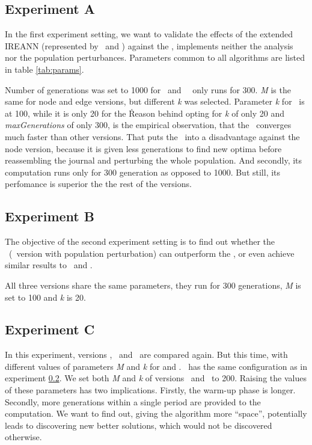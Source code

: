 \documentclass[twoside]{ctuthesis}
\theoremstyle{plain}
\theoremstyle{definition}
\theoremstyle{note}
\begin{document}
\subsection{Experiment A}
\label{sec:expadesc}
In the first experiment setting, we want to validate the effects of the extended IREANN (represented by \nnsrnode\ and \nnsredge) against the \nnsrvanilla, implements neither the analysis nor the population perturbances. Parameters common to all algorithms are listed in table \ref{tab:params}.

Number of generations was set to 1000 for \nnsrvanilla\ and \nnsrnode\, \nnsredge\ only runs for 300. \emph{M} is the same for node and edge versions, but different \emph{k} was selected. Parameter \emph{k} for \nnsrnode\ is at 100, while it is only 20 for the \nnsredge\. Reason behind opting for \emph{k} of only 20 and \emph{maxGenerations} of only 300, is the empirical observation, that the \nnsredge\ converges much faster than other versions.
That puts the \nnsredge\ into a disadvantage against the node version, because it is given less generations to find new optima before reassembling the journal and perturbing the whole population. And secondly, its computation runs only for 300 generation as opposed to 1000. But still, its perfomance is superior the the rest of the versions.


\subsection{Experiment B}
\label{sec:expbdesc}

The objective of the second experiment setting is to find out whether the \nnsrbasic\ (\nnsrvanilla\ version with population perturbation) can outperform the \nnsrvanilla, or even achieve similar results to \nnsrnode\ and \nnsredge.

All three versions share the same parameters, they run for 300 generations, \emph{M} is set to 100 and \emph{k} is 20.

\subsection{Experiment C}
\label{sec:expcdesc}

In this experiment, versions \nnsrbasic, \nnsrnode\ and \nnsredge\ are compared again. But this time, with different values of parameters \emph{M} and \emph{k} for \nnsrbasic and \nnsrnode. \nnsredge\ has the same configuration as in experiment \ref{sec:expbdesc}. We set both \emph{M} and \emph{k} of versions \nnsrbasic\ and \nnsrnode\ to 200. Raising the values of these parameters has two implications. Firstly, the warm-up phase is longer. Secondly, more generations within a single period are provided to the computation. We want to find out, giving the algorithm more ``space'', potentially leads to discovering new better solutions, which would not be discovered otherwise.
\end{document}
